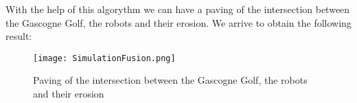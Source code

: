 \vfill

\clearpage



\newpage

	With the help of this algorythm we can have a paving of the intersection between the Gascogne Golf, the robots and their erosion. We arrive to obtain the following result:
	

	
	\begin{figure}[!h] 
    \center
    	\texttt{[image: SimulationFusion.png]} 
    	\caption{Paving of the intersection between the Gascogne Golf, the robots and their erosion } 
    \label{S1 U S2}
	\end{figure} 
